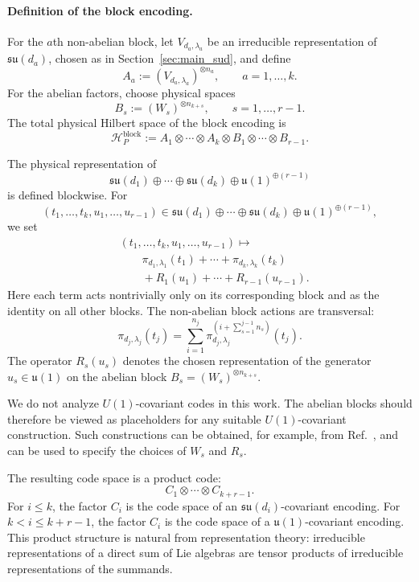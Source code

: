 \documentclass[10pt,twocolumn,superscriptaddress,aps,amsmath,amssymb,citeautoscript,floatfix,prx]{revtex4-2}
\newcounter{alg}
\theoremstyle{plain}
\theoremstyle{plain}
\theoremstyle{plain}
\theoremstyle{plain}
\theoremstyle{plain}
\theoremstyle{plain}
\begin{document}
\paragraph{Definition of the block encoding.}

For the $a$th non-abelian block, let $V_{d_a,\lambda_a}$ be an irreducible representation of $\mathfrak{su}(d_a)$, chosen as in Section~\ref{sec:main_sud}, and define
$$
A_a
:=
(V_{d_a,\lambda_a})^{\otimes n_a},
\qquad
a=1,\ldots,k .
$$
For the abelian factors, choose physical spaces
$$
B_s
:=
(W_s)^{\otimes n_{k+s}},
\qquad
s=1,\ldots,r-1 .
$$
The total physical Hilbert space of the block encoding is
$$
\mathcal H_P^{\mathrm{block}}
:=
A_1
\otimes
\cdots
\otimes
A_k
\otimes
B_1
\otimes
\cdots
\otimes
B_{r-1}.
$$

The physical representation of
$$
\mathfrak{su}(d_1)
\oplus
\cdots
\oplus
\mathfrak{su}(d_k)
\oplus
\mathfrak{u}(1)^{\oplus(r-1)}
$$
is defined blockwise. For
$$
(t_1,\ldots,t_k,u_1,\ldots,u_{r-1})
\in
\mathfrak{su}(d_1)
\oplus
\cdots
\oplus
\mathfrak{su}(d_k)
\oplus
\mathfrak{u}(1)^{\oplus(r-1)},
$$
we set
\begin{equation}\label{eq:block_enc_def}
\begin{aligned}
&(t_1,\ldots,t_k,u_1,\ldots,u_{r-1})
\longmapsto
\\
&\qquad
\pi_{d_1,\lambda_1}(t_1)
+
\cdots
+
\pi_{d_k,\lambda_k}(t_k)\\
&\qquad+
R_1(u_1)
+
\cdots
+
R_{r-1}(u_{r-1}) .
\end{aligned}
\end{equation}
Here each term acts nontrivially only on its corresponding block and as the identity on all other blocks. The non-abelian block actions are transversal:
\begin{equation}
\pi_{d_j,\lambda_j}(t_j)
=
\sum_{i=1}^{n_j}
\pi_{d_j,\lambda_j}^{(i+\sum_{s=1}^{j-1}n_s)}(t_j).
\end{equation}
The operator $R_s(u_s)$ denotes the chosen representation of the generator $u_s\in\mathfrak{u}(1)$ on the abelian block $B_s=(W_s)^{\otimes n_{k+s}}$.

We do not analyze $U(1)$-covariant codes in this work. The abelian blocks should therefore be viewed as placeholders for any suitable $U(1)$-covariant construction. Such constructions can be obtained, for example, from Ref.~\cite{Lin2025}, and can be used to specify the choices of $W_s$ and $R_s$.

The resulting code space is a product code:
\begin{equation}\label{eq:product_code}
C_1
\otimes
\cdots
\otimes
C_{k+r-1}.
\end{equation}
For $i\le k$, the factor $C_i$ is the code space of an $\mathfrak{su}(d_i)$-covariant encoding. For $k<i\le k+r-1$, the factor $C_i$ is the code space of a $\mathfrak{u}(1)$-covariant encoding. This product structure is natural from representation theory: irreducible representations of a direct sum of Lie algebras are tensor products of irreducible representations of the summands.
\end{document}
